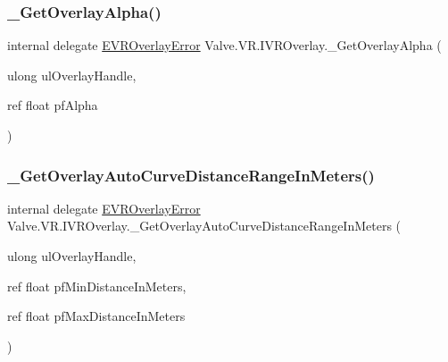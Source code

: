 \subsubsection{\texorpdfstring{\_GetOverlayAlpha()}{\_GetOverlayAlpha()}}
{\footnotesize\ttfamily internal delegate \mbox{\hyperlink{namespace_valve_1_1_v_r_aaee5c5144f42b7969d45b854f51b0c18}{E\+V\+R\+Overlay\+Error}} Valve.\+V\+R.\+I\+V\+R\+Overlay.\+\_\+\+Get\+Overlay\+Alpha (\begin{DoxyParamCaption}\item[{ulong}]{ul\+Overlay\+Handle,  }\item[{ref float}]{pf\+Alpha }\end{DoxyParamCaption})}

\mbox{\label{struct_valve_1_1_v_r_1_1_i_v_r_overlay_aea87edea8fd7762358e5a3d3dfd94345}} 
\subsubsection{\texorpdfstring{\_GetOverlayAutoCurveDistanceRangeInMeters()}{\_GetOverlayAutoCurveDistanceRangeInMeters()}}
{\footnotesize\ttfamily internal delegate \mbox{\hyperlink{namespace_valve_1_1_v_r_aaee5c5144f42b7969d45b854f51b0c18}{E\+V\+R\+Overlay\+Error}} Valve.\+V\+R.\+I\+V\+R\+Overlay.\+\_\+\+Get\+Overlay\+Auto\+Curve\+Distance\+Range\+In\+Meters (\begin{DoxyParamCaption}\item[{ulong}]{ul\+Overlay\+Handle,  }\item[{ref float}]{pf\+Min\+Distance\+In\+Meters,  }\item[{ref float}]{pf\+Max\+Distance\+In\+Meters }\end{DoxyParamCaption})}

\mbox{\label{struct_valve_1_1_v_r_1_1_i_v_r_overlay_a8a389fa30b6c03914919dca699444cdd}} 
